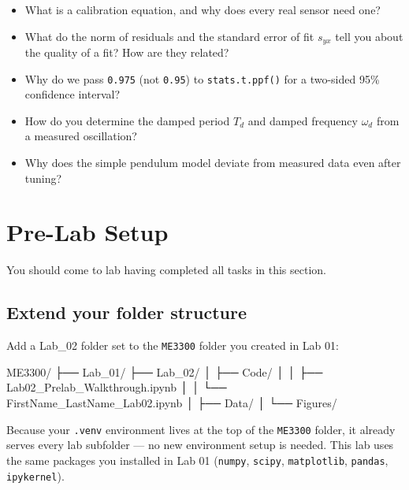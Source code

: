 \documentclass[
  12pt,
  letterpaper,
]{article}
\newenvironment{Shaded}{\begin{snugshade}}{\end{snugshade}}
\newcommand{\NormalTok}[1]{\textcolor[rgb]{0.00,0.23,0.31}{#1}}
\providecommand{\tightlist}{%
  \setlength{\itemsep}{0pt}\setlength{\parskip}{0pt}}
\begin{document}
\begin{itemize}
\tightlist
\item
  What is a calibration equation, and why does every real sensor need
  one?
\item
  What do the norm of residuals and the standard error of fit \(s_{yx}\)
  tell you about the quality of a fit? How are they related?
\item
  Why do we pass \texttt{0.975} (not \texttt{0.95}) to
  \texttt{stats.t.ppf()} for a two-sided 95\% confidence interval?
\item
  How do you determine the damped period \(T_d\) and damped frequency
  \(\omega_d\) from a measured oscillation?
\item
  Why does the simple pendulum model deviate from measured data even
  after tuning?
\end{itemize}

\newpage{}

\section{Pre-Lab Setup}\label{pre-lab-setup}

You should come to lab having completed all tasks in this section.

\subsection{Extend your folder
structure}\label{extend-your-folder-structure}

Add a Lab\_02 folder set to the \texttt{ME3300} folder you created in
Lab 01:

\begin{Shaded}
\begin{Highlighting}[]
\NormalTok{ME3300/}
\NormalTok{├── Lab\_01/}
\NormalTok{├── Lab\_02/}
\NormalTok{│   ├── Code/}
\NormalTok{│   │   ├── Lab02\_Prelab\_Walkthrough.ipynb}
\NormalTok{│   │   └── FirstName\_LastName\_Lab02.ipynb}
\NormalTok{│   ├── Data/}
\NormalTok{│   └── Figures/}
\end{Highlighting}
\end{Shaded}

Because your \texttt{.venv} environment lives at the top of the
\texttt{ME3300} folder, it already serves every lab subfolder --- no new
environment setup is needed. This lab uses the same packages you
installed in Lab 01 (\texttt{numpy}, \texttt{scipy},
\texttt{matplotlib}, \texttt{pandas}, \texttt{ipykernel}).
\end{document}
